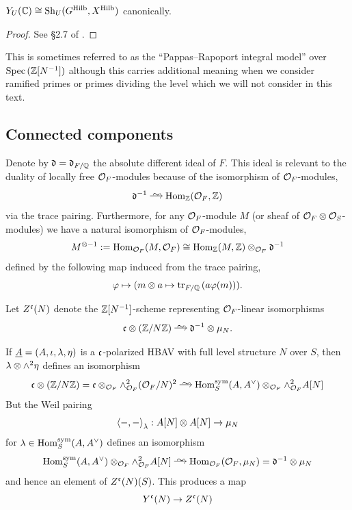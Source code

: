 \documentclass[main.tex]{subfiles}
\begin{document}
\begin{theorem} 
$Y_U(\mathbb{C}) \cong \mathrm{Sh}_U(G^{\operatorname{\mathrm{Hilb}}}, X^{\operatorname{\mathrm{Hilb}}})$ canonically.
\end{theorem}

\begin{proof}
See \S2.7 of \cite{diamond:serre_weight}.
\end{proof}

This is sometimes referred to as the ``Pappas–Rapoport integral model'' over $\operatorname{\mathrm{Spec}}{(\mathbb{Z}[N^{-1}])}$ although this carries additional meaning when we consider ramified primes or primes dividing the level which we will not consider in this text. 



\subsection{Connected components}

Denote by $\mathfrak{d} = \mathfrak{d}_{F/\mathbb{Q}}$ the absolute different ideal of $F$. This ideal is relevant to the duality of locally free $\mathcal{O}_F$-modules because of the isomorphism of $\mathcal{O}_F$-modules,
\[ \dd^{-1} \iso \Hom_{\ZZ}(\cO_F, \ZZ) \]
via the trace pairing. Furthermore, for any $\mathcal{O}_F$-module $M$ (or sheaf of $\mathcal{O}_F \otimes \mathcal{O}_S$-modules) we have a natural isomorphism of $\mathcal{O}_F$-modules,
\[ M^{\otimes -1} := \operatorname{\mathrm{Hom}}_{\mathcal{O}_F}(M, \mathcal{O}_F) \cong \operatorname{\mathrm{Hom}}_{\mathbb{Z}}(M, \mathbb{Z}) \otimes_{\mathcal{O}_F} \mathfrak{d}^{-1} \]
defined by the following map induced from the trace pairing,
\[ \varphi \mapsto (m \otimes a \mapsto \operatorname{\mathrm{tr}}_{F/\mathbb{Q}}{(a \varphi(m))}). \]

\begin{defn}
Let $Z^{\mathfrak{c}}(N)$ denote the $\mathbb{Z}[N^{-1}]$-scheme representing $\mathcal{O}_F$-linear isomorphisms
\[ \cc \ot (\Z / N \Z) \iso \dd^{-1} \ot \mu_N. \] 
\end{defn}
If $\underline{A} = (A, \iota, \lambda, \eta)$ is a $\mathfrak{c}$-polarized HBAV with full level structure $N$ over $S$, then $\lambda \otimes \wedge^2 \eta$ defines an isomorphism
\[ \cc \ot (\Z / N \Z) = \cc \ot_{\cO_F} \wedge^2_{\cO_F} (\cO_F / N)^2 \iso \Hom_{S}^{\text{sym}}(A, A^{\vee}) \ot_{\cO_F} \wedge_{\cO_F}^2 A[N] \]
But the Weil pairing
\[ \left< -, - \right>_{\lambda} : A[N] \otimes A[N] \to \mu_{N} \]
for $\lambda \in \operatorname{\mathrm{Hom}}_{S}^{\text{sym}}(A, A^{\vee})$ defines an isomorphism
\[ \Hom_{S}^{\text{sym}}(A, A^{\vee}) \ot_{\cO_F} \wedge_{\cO_F}^2 A[N] \iso \Hom_{\cO_F}(\cO_F, \mu_N) = \dd^{-1} \ot \mu_N \]
and hence an element of $Z^{\mathfrak{c}}(N)(S)$. This produces a map
\[ Y^{\mathfrak{c}}(N) \to Z^{\mathfrak{c}}(N) \]
\end{document}

